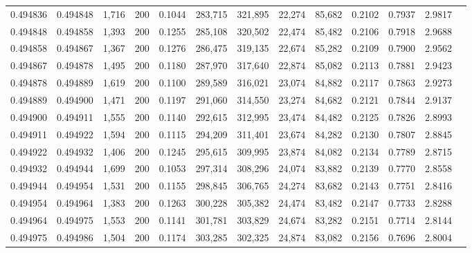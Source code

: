 \begin{tabular}{rrrrrrrrrrrrr}
0.494836 & 0.494848 & 1,716 & 200 &                                     0.1044 & 283,715 & 321,895 &  22,274 &  85,682 & 0.2102 & 0.7937 & 2.9817 \\
0.494848 & 0.494858 & 1,393 & 200 &                                     0.1255 & 285,108 & 320,502 &  22,474 &  85,482 & 0.2106 & 0.7918 & 2.9688 \\
0.494858 & 0.494867 & 1,367 & 200 &                                     0.1276 & 286,475 & 319,135 &  22,674 &  85,282 & 0.2109 & 0.7900 & 2.9562 \\
0.494867 & 0.494878 & 1,495 & 200 &                                     0.1180 & 287,970 & 317,640 &  22,874 &  85,082 & 0.2113 & 0.7881 & 2.9423 \\
0.494878 & 0.494889 & 1,619 & 200 &                                     0.1100 & 289,589 & 316,021 &  23,074 &  84,882 & 0.2117 & 0.7863 & 2.9273 \\
0.494889 & 0.494900 & 1,471 & 200 &                                     0.1197 & 291,060 & 314,550 &  23,274 &  84,682 & 0.2121 & 0.7844 & 2.9137 \\
0.494900 & 0.494911 & 1,555 & 200 &                                     0.1140 & 292,615 & 312,995 &  23,474 &  84,482 & 0.2125 & 0.7826 & 2.8993 \\
0.494911 & 0.494922 & 1,594 & 200 &                                     0.1115 & 294,209 & 311,401 &  23,674 &  84,282 & 0.2130 & 0.7807 & 2.8845 \\
0.494922 & 0.494932 & 1,406 & 200 &                                     0.1245 & 295,615 & 309,995 &  23,874 &  84,082 & 0.2134 & 0.7789 & 2.8715 \\
0.494932 & 0.494944 & 1,699 & 200 &                                     0.1053 & 297,314 & 308,296 &  24,074 &  83,882 & 0.2139 & 0.7770 & 2.8558 \\
0.494944 & 0.494954 & 1,531 & 200 &                                     0.1155 & 298,845 & 306,765 &  24,274 &  83,682 & 0.2143 & 0.7751 & 2.8416 \\
0.494954 & 0.494964 & 1,383 & 200 &                                     0.1263 & 300,228 & 305,382 &  24,474 &  83,482 & 0.2147 & 0.7733 & 2.8288 \\
0.494964 & 0.494975 & 1,553 & 200 &                                     0.1141 & 301,781 & 303,829 &  24,674 &  83,282 & 0.2151 & 0.7714 & 2.8144 \\
0.494975 & 0.494986 & 1,504 & 200 &                                     0.1174 & 303,285 & 302,325 &  24,874 &  83,082 & 0.2156 & 0.7696 & 2.8004 \\

\end{tabular}
